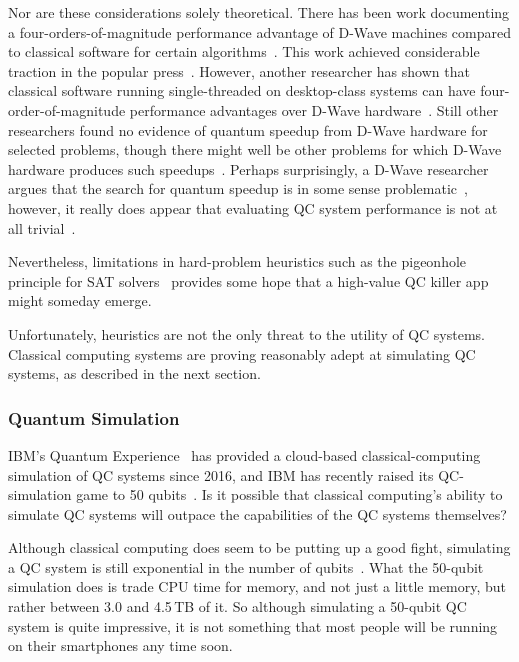 Nor are these considerations solely theoretical.
There has been work documenting a four-orders-of-magnitude
performance advantage of D-Wave machines compared to classical
software for certain algorithms~\cite{McGeoch:2013:EEA:2482767.2482797}.
This work achieved considerable traction in the popular
press~\cite{CharlesChoi2013D-WaveGoogleNASA}.
However, another researcher has shown that classical software running
single-threaded on desktop-class systems can
have four-order-of-magnitude performance advantages over
D-Wave hardware~\cite{AlexSelby2014D-Wave-vs-classical,AlexSelby2013D-WaveHarderQUBO}.
Still other researchers found no evidence of quantum speedup
from D-Wave hardware for selected problems, though there might well be
other problems for which D-Wave hardware produces such
speedups~\cite{AdrianCho2014QC-D-WaveNoSpeedup,TroelsFRonnow2014QC-D-WaveNoSpeedup}.
Perhaps surprisingly, a D-Wave researcher argues that the search for
quantum speedup is in some sense
problematic~\cite{MohammadHAmin2015QC-D-Wave-QuantumSpeedupProblematic},
however, it really does appear that evaluating QC system performance is
not at all
trivial~\cite{PhysRevLett.118.100601,ArsTechnica2017QC-SpeedTradeoffs}.

Nevertheless, limitations in hard-problem heuristics such as the
pigeonhole principle for SAT
solvers~\cite[page~38]{Kroening:2008:DPA:1391237}
provides some hope that a high-value QC killer app might someday emerge.

Unfortunately, heuristics are not the only threat to the utility
of QC systems.
Classical computing systems are proving reasonably adept at simulating
QC systems, as described in the next section.

\subsubsection{Quantum Simulation}
\label{sec:future:Quantum Simulation}

IBM's Quantum Experience~\cite{IBM2016QuantumExperience}
has provided a cloud-based classical-computing simulation of
QC systems since 2016, and IBM has recently raised its
QC-simulation game to 50 qubits~\cite{WillKnight2017IBM50qubitSim}.
Is it possible that classical computing's ability to simulate
QC systems will outpace the capabilities of the QC systems themselves?

Although classical computing does seem to be putting up a good fight,
simulating a QC system is still exponential in the number of
qubits~\cite{ScottAaronson2017IBM50qubitSim}.
What the 50-qubit simulation does is trade CPU time for memory, and not
just a little memory, but rather between 3.0 and 4.5\,TB of it.
So although simulating a 50-qubit QC system is quite impressive,
it is not something that most people will be
running on their smartphones any time soon.

